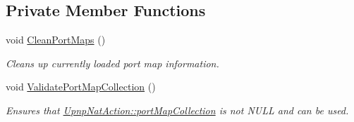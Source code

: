 \subsection*{Private Member Functions}
\begin{DoxyCompactItemize}
\item 
\hypertarget{class_upnp_nat_action_ac67da4868a4dd1d7d85270b9f684cae4}{
void \hyperlink{class_upnp_nat_action_ac67da4868a4dd1d7d85270b9f684cae4}{CleanPortMaps} ()}
\label{class_upnp_nat_action_ac67da4868a4dd1d7d85270b9f684cae4}

\begin{DoxyCompactList}\small\item\em Cleans up currently loaded port map information. \item\end{DoxyCompactList}\item 
\hypertarget{class_upnp_nat_action_a4dcca32b5e821a54f372d0940a5d4136}{
void \hyperlink{class_upnp_nat_action_a4dcca32b5e821a54f372d0940a5d4136}{ValidatePortMapCollection} ()}
\label{class_upnp_nat_action_a4dcca32b5e821a54f372d0940a5d4136}

\begin{DoxyCompactList}\small\item\em Ensures that \hyperlink{class_upnp_nat_action_ad39607309f300cd4f7c92c50bfffe978}{UpnpNatAction::portMapCollection} is not NULL and can be used. \item\end{DoxyCompactList}\end{DoxyCompactItemize}
